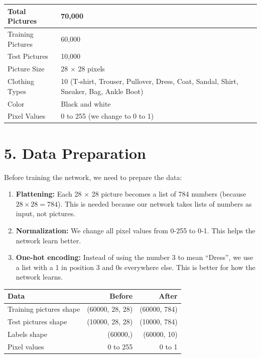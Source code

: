 \documentclass[11pt]{article}
\begin{document}
\begin{center}
\begin{tabular}{|l|l|}
\hline
Total Pictures & 70,000\\ \hline
Training Pictures & 60,000\\ \hline
Test Pictures & 10,000\\ \hline
Picture Size & 28 $\times$ 28 pixels\\ \hline
Clothing Types & 10 (T-shirt, Trouser, Pullover, Dress, Coat, Sandal, Shirt, Sneaker, Bag, Ankle Boot)\\ \hline
Color & Black and white\\ \hline
Pixel Values & 0 to 255 (we change to 0 to 1)\\ \hline
\end{tabular}
\end{center}

\section*{5. Data Preparation}

Before training the network, we need to prepare the data:

\begin{enumerate}[leftmargin=*]
\item \textbf{Flattening:} Each 28 $\times$ 28 picture becomes a list of 784 numbers (because $28 \times 28 = 784$). This is needed because our network takes lists of numbers as input, not pictures.

\item \textbf{Normalization:} We change all pixel values from 0-255 to 0-1. This helps the network learn better.

\item \textbf{One-hot encoding:} Instead of using the number 3 to mean ``Dress'', we use a list with a 1 in position 3 and 0s everywhere else. This is better for how the network learns.

\end{enumerate}

\begin{center}
\begin{tabular}{|l|r|r|}
\hline
\textbf{Data} & \textbf{Before} & \textbf{After}\\ \hline
Training pictures shape & (60000, 28, 28) & (60000, 784)\\ \hline
Test pictures shape & (10000, 28, 28) & (10000, 784)\\ \hline
Labels shape & (60000,) & (60000, 10)\\ \hline
Pixel values & 0 to 255 & 0 to 1\\ \hline
\end{tabular}
\end{center}
\end{document}
